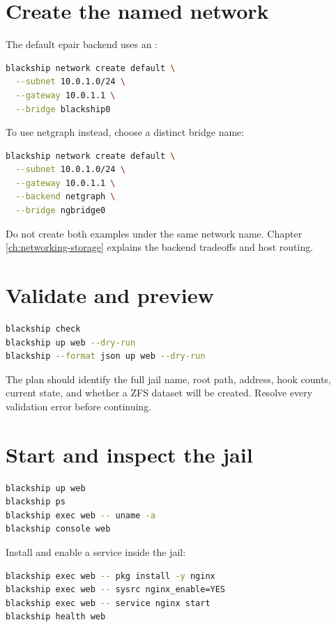 \section{Create the named network}

The default epair backend uses an :

\begin{lstlisting}[language=bash]
blackship network create default \
  --subnet 10.0.1.0/24 \
  --gateway 10.0.1.1 \
  --bridge blackship0
\end{lstlisting}

To use netgraph instead, choose a distinct bridge name:

\begin{lstlisting}[language=bash]
blackship network create default \
  --subnet 10.0.1.0/24 \
  --gateway 10.0.1.1 \
  --backend netgraph \
  --bridge ngbridge0
\end{lstlisting}

Do not create both examples under the same network name. Chapter
\ref{ch:networking-storage} explains the backend tradeoffs and host routing.

\section{Validate and preview}

\begin{lstlisting}[language=bash]
blackship check
blackship up web --dry-run
blackship --format json up web --dry-run
\end{lstlisting}

The plan should identify the full jail name, root path, address, hook counts,
current state, and whether a ZFS dataset will be created. Resolve every
validation error before continuing.

\section{Start and inspect the jail}

\begin{lstlisting}[language=bash]
blackship up web
blackship ps
blackship exec web -- uname -a
blackship console web
\end{lstlisting}

Install and enable a service inside the jail:

\begin{lstlisting}[language=bash]
blackship exec web -- pkg install -y nginx
blackship exec web -- sysrc nginx_enable=YES
blackship exec web -- service nginx start
blackship health web
\end{lstlisting}

